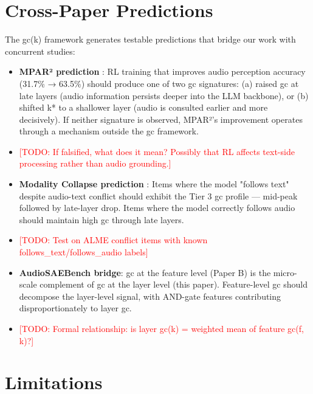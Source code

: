 \documentclass[a4paper]{article}
\begin{document}
{{\section{Cross-Paper Predictions}

The gc(k) framework generates testable predictions that bridge our work with concurrent studies:

\begin{itemize}
\item \textbf{MPAR² prediction} \cite{chen2603}: RL training that improves audio perception accuracy (31.7\% → 63.5\%) should produce one of two gc signatures: (a) raised gc at late layers (audio information persists deeper into the LLM backbone), or (b) shifted k* to a shallower layer (audio is consulted earlier and more decisively). If neither signature is observed, MPAR²'s improvement operates through a mechanism outside the gc framework.
\item \textcolor{red}{[TODO: If falsified, what does it mean? Possibly that RL affects text-side processing rather than audio grounding.]}
\end{itemize}

\begin{itemize}
\item \textbf{Modality Collapse prediction} \cite{zhao2602}: Items where the model "follows text" despite audio-text conflict should exhibit the Tier 3 gc profile — mid-peak followed by late-layer drop. Items where the model correctly follows audio should maintain high gc through late layers.
\item \textcolor{red}{[TODO: Test on ALME conflict items with known follows_text/follows_audio labels]}
\end{itemize}

\begin{itemize}
\item \textbf{AudioSAEBench bridge}: gc at the feature level (Paper B) is the micro-scale complement of gc at the layer level (this paper). Feature-level gc should decompose the layer-level signal, with AND-gate features contributing disproportionately to layer gc.
\item \textcolor{red}{[TODO: Formal relationship: is layer gc(k) = weighted mean of feature gc(f, k)?]}
\end{itemize}


\section{Limitations}

}}
\end{document}
